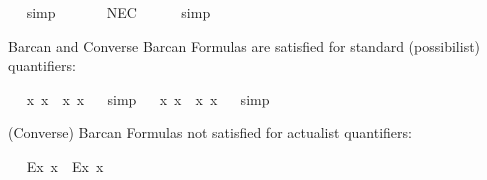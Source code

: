 \begin{isabellebody}
\isadelimproof
\ %
\endisadelimproof
%
\isatagproof
{}\isamarkupfalse%
\ simp\ \ \ \ %
%
\endisatagproof
{\isafoldproof}%
%
\isadelimproof
%
\endisadelimproof
\isanewline
\ \isamarkupfalse%
\ NEC{\isacharcolon}\ {\isachardoublequoteopen}{\isasymlfloor}{\isasymphi}{\isasymrfloor}\ {\isasymLongrightarrow}\ {\isasymlfloor}\isactrlbold {\isasymbox}{\isasymphi}{\isasymrfloor}{\isachardoublequoteclose}%
\isadelimproof
\ %
\endisadelimproof
%
\isatagproof
{}\isamarkupfalse%
\ simp\ \ \ \ %
%
\endisatagproof
{\isafoldproof}%
%
\isadelimproof
%
\endisadelimproof
%
\begin{isamarkuptext}%
Barcan and Converse Barcan Formulas are satisfied for standard (possibilist) quantifiers:%
\end{isamarkuptext}\isamarkuptrue%
\ \isamarkupfalse%
\ {\isachardoublequoteopen}{\isasymlfloor}{\isacharparenleft}\isactrlbold {\isasymforall}x{\isachardot}\isactrlbold {\isasymbox}{\isacharparenleft}{\isasymphi}\ x{\isacharparenright}{\isacharparenright}\ \isactrlbold {\isasymrightarrow}\ \isactrlbold {\isasymbox}{\isacharparenleft}\isactrlbold {\isasymforall}x{\isachardot}{\isacharparenleft}{\isasymphi}\ x{\isacharparenright}{\isacharparenright}{\isasymrfloor}{\isachardoublequoteclose}%
\isadelimproof
\ %
\endisadelimproof
%
\isatagproof
{}\isamarkupfalse%
\ simp%
\endisatagproof
{\isafoldproof}%
%
\isadelimproof
%
\endisadelimproof
\isanewline
\ \isamarkupfalse%
\ {\isachardoublequoteopen}{\isasymlfloor}\isactrlbold {\isasymbox}{\isacharparenleft}\isactrlbold {\isasymforall}x{\isachardot}{\isacharparenleft}{\isasymphi}\ x{\isacharparenright}{\isacharparenright}\ \isactrlbold {\isasymrightarrow}\ {\isacharparenleft}\isactrlbold {\isasymforall}x{\isachardot}\isactrlbold {\isasymbox}{\isacharparenleft}{\isasymphi}\ x{\isacharparenright}{\isacharparenright}{\isasymrfloor}{\isachardoublequoteclose}%
\isadelimproof
\ %
\endisadelimproof
%
\isatagproof
{}\isamarkupfalse%
\ simp%
\endisatagproof
{\isafoldproof}%
%
\isadelimproof
%
\endisadelimproof
%
\begin{isamarkuptext}%
(Converse) Barcan Formulas not satisfied for actualist quantifiers:%
\end{isamarkuptext}\isamarkuptrue%
\ \isamarkupfalse%
\ {\isachardoublequoteopen}{\isasymlfloor}{\isacharparenleft}\isactrlbold {\isasymforall}\isactrlsup Ex{\isachardot}\isactrlbold {\isasymbox}{\isacharparenleft}{\isasymphi}\ x{\isacharparenright}{\isacharparenright}\ \isactrlbold {\isasymrightarrow}\ \isactrlbold {\isasymbox}{\isacharparenleft}\isactrlbold {\isasymforall}\isactrlsup Ex{\isachardot}{\isacharparenleft}{\isasymphi}\ x{\isacharparenright}{\isacharparenright}{\isasymrfloor}{\isachardoublequoteclose}\ \isamarkupfalse%

\end{isabellebody}
